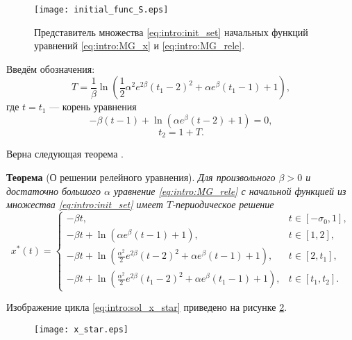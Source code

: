 \begin{figure}
	\centering
	\texttt{[image: initial\_func\_S.eps]}
	\caption{Представитель множества \eqref{eq:intro:init_set} начальных функций уравнений \eqref{eq:intro:MG_x} и \eqref{eq:intro:MG_rele}.}
	\label{fig:intro:initial_funcs:ch1}
\end{figure}

Введём обозначения:
\begin{equation}
	\label{eq:intro:T}
	T = \frac{1}{\beta} \ln\left(\frac{1}{2}\alpha^2e^{2\beta}(t_1 - 2)^2 + \alpha e^{\beta}(t_1 - 1) + 1\right),
\end{equation}
где $t = t_1$ --- корень уравнения 
\begin{equation}
	\label{eq:intro:t1_cond_exp}
	-\beta(t - 1) + \ln(\alpha e^{\beta}(t - 2) + 1) = 0,
\end{equation}
\begin{equation}
	\label{eq:intro:t2_period}
	t_2 = 1 + T.
\end{equation}

Верна следующая теорема \cite{wosbib1}.

\textbf{Теорема} (О решении релейного уравнения). \textit{
	Для произвольного $\beta > 0$ и достаточно большого $\alpha$ уравнение \eqref{eq:intro:MG_rele} с начальной функцией из множества \eqref{eq:intro:init_set} имеет $T$-периодическое решение
	\small
	\begin{equation}
		\label{eq:intro:sol_x_star}
		x^*(t)= 
		\begin{cases}
			-\beta t, & t\in[-\sigma_0, 1],\\
			-\beta t +\ln(\alpha e^{\beta}(t - 1)+1), & t\in[1, 2],\\
			-\beta t + \ln(\frac{\alpha^2}{2}e^{2\beta}(t - 2)^2+\alpha e^{\beta}(t - 1)+1), & t\in[2, t_1],\\
			-\beta t + \ln(\frac{\alpha^2}{2}e^{2\beta}(t_1 - 2)^2+\alpha e^{\beta}(t_1 - 1) + 1), & t\in[t_1, t_2].
		\end{cases}
	\end{equation}
	\normalsize
}

Изображение цикла \eqref{eq:intro:sol_x_star} приведено на рисунке \ref{fig:intro:x_star:ch1}.

\begin{figure}
	\centering
	\texttt{[image: x\_star.eps]}
	\label{fig:intro:x_star:ch1}
\end{figure}

